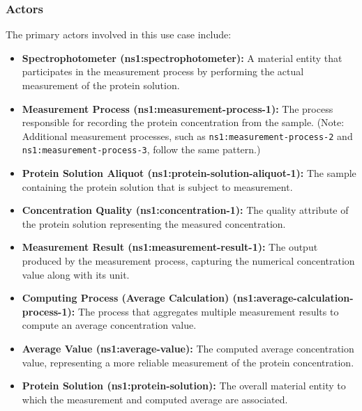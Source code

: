 \subsubsection{Actors}
The primary actors involved in this use case include:
\begin{itemize}[noitemsep]
    \item \textbf{Spectrophotometer (ns1:spectrophotometer):} A material entity that participates in the measurement process by performing the actual measurement of the protein solution.
    \item \textbf{Measurement Process (ns1:measurement-process-1):} The process responsible for recording the protein concentration from the sample. (Note: Additional measurement processes, such as \texttt{ns1:measurement-process-2} and \texttt{ns1:measurement-process-3}, follow the same pattern.)
    \item \textbf{Protein Solution Aliquot (ns1:protein-solution-aliquot-1):} The sample containing the protein solution that is subject to measurement.
    \item \textbf{Concentration Quality (ns1:concentration-1):} The quality attribute of the protein solution representing the measured concentration.
    \item \textbf{Measurement Result (ns1:measurement-result-1):} The output produced by the measurement process, capturing the numerical concentration value along with its unit.
    \item \textbf{Computing Process (Average Calculation) (ns1:average-calculation-process-1):} The process that aggregates multiple measurement results to compute an average concentration value.
    \item \textbf{Average Value (ns1:average-value):} The computed average concentration value, representing a more reliable measurement of the protein concentration.
    \item \textbf{Protein Solution (ns1:protein-solution):} The overall material entity to which the measurement and computed average are associated.
\end{itemize}



